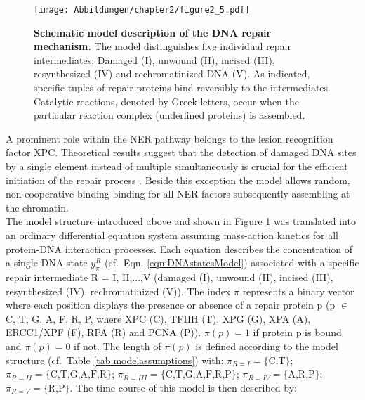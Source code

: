 \begin{figure}[t!]
\begin{center}
\texttt{[image: Abbildungen/chapter2/figure2\_5.pdf]}
\caption{\textbf{Schematic model description of the DNA repair mechanism.} The model distinguishes five individual repair intermediates: Damaged (I), unwound (II), incised (III), resynthesized (IV) and rechromatinized DNA (V). As indicated, specific tuples of repair proteins bind reversibly to the intermediates. Catalytic reactions, denoted by Greek letters, occur when the particular reaction complex (underlined proteins) is assembled. }
\label{fig:ModelStructure}
\end{center}
\end{figure}
A prominent role within the NER pathway belongs to the lesion recognition factor XPC. Theoretical results suggest that the detection of damaged DNA sites by a single element instead of multiple simultaneously is crucial for the efficient initiation of the repair process \cite{Politi2005}. Beside this exception the model allows random, non-cooperative binding binding for all NER factors subsequently assembling at the chromatin.\\    
The model structure introduced above and shown in Figure \ref{fig:ModelStructure} was translated into an ordinary differential equation system assuming mass-action kinetics for all protein-DNA interaction processes. Each equation describes the concentration of a single DNA state $y_{\pi}^{R}$ (cf.\ Eqn. \ref{eqn:DNAstatesModel}) associated with a specific repair intermediate R = I, II,...,V (damaged (I), unwound (II), incised (III), resynthesized (IV), rechromatinized (V)). The index $\pi$ represents a binary vector where each position displays the presence or absence of a repair protein p (p $\in$ {C, T, G, A, F, R, P}, where XPC (C), TFIIH (T), XPG (G), XPA (A), ERCC1/XPF (F), RPA (R) and PCNA (P)). $\pi(p)=1$ if protein p is bound and $\pi(p)=0$ if not. The length of $\pi(p)$ is defined according to the model structure (cf.\ Table \ref{tab:modelassumptions}) with: $\pi_{R=I} = \{ \text{C,T} \}$; $\pi_{R=II} = \{ \text{C,T,G,A,F,R} \}$; $\pi_{R=III} = \{ \text{C,T,G,A,F,R,P} \}$; $\pi_{R=IV} = \{ \text{A,R,P} \}$; $\pi_{R=V} = \{ \text{R,P} \}$. The time course of this model is then described by:

